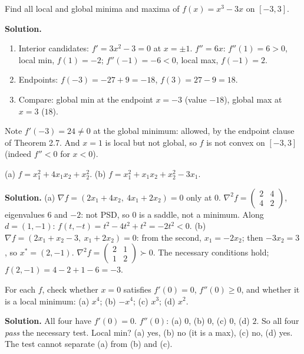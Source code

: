 \begin{example}
Find all local and global minima and maxima of $f(x)=x^3-3x$ on $[-3,3]$.

\textbf{Solution.}
\begin{enumerate}
  \item Interior candidates: $f'=3x^2-3=0$ at $x=\pm1$. $f''=6x$: $f''(1)=6>0$, local min, $f(1)=-2$; $f''(-1)=-6<0$, local max, $f(-1)=2$.
  \item Endpoints: $f(-3)=-27+9=-18$, $f(3)=27-9=18$.
  \item Compare: global min at the endpoint $x=-3$ (value $-18$), global max at $x=3$ ($18$).
\end{enumerate}
Note $f'(-3)=24\ne0$ at the global minimum: allowed, by the endpoint clause of Theorem 2.7. And $x=1$ is local but not global, so $f$ is not convex on
$[-3,3]$ (indeed $f''<0$ for $x<0$).
\end{example}

\begin{example}
(a) $f=x_1^2+4x_1x_2+x_2^2$. (b) $f=x_1^2+x_1x_2+x_2^2-3x_1$.

\textbf{Solution.} (a) $\nabla f=(2x_1+4x_2,\ 4x_1+2x_2)=0$ only at $0$. $\nabla^2f=\begin{pmatrix}2&4\\4&2\end{pmatrix}$, eigenvalues $6$ and $-2$: not PSD, so $0$ is a
saddle, not a minimum. Along $d=(1,-1)$: $f(t,-t)=t^2-4t^2+t^2=-2t^2<0$.
(b) $\nabla f=(2x_1+x_2-3,\ x_1+2x_2)=0$: from the second, $x_1=-2x_2$; then $-3x_2=3$, so $x^*=(2,-1)$.
$\nabla^2f=\begin{pmatrix}2&1\\1&2\end{pmatrix}\succ0$. The necessary conditions hold; $f(2,-1)=4-2+1-6=-3$.
\end{example}

\begin{example}
For each $f$, check whether $x=0$ satisfies $f'(0)=0$, $f''(0)\ge0$, and whether it is a local minimum: (a) $x^4$; (b) $-x^4$; (c) $x^3$; (d) $x^2$.

\textbf{Solution.} All four have $f'(0)=0$. $f''(0)$: (a) $0$, (b) $0$, (c) $0$, (d) $2$. So all four \emph{pass} the necessary test.
Local min? (a) yes, (b) no (it is a max), (c) no, (d) yes. The test cannot separate (a) from (b) and (c).
\end{example}


